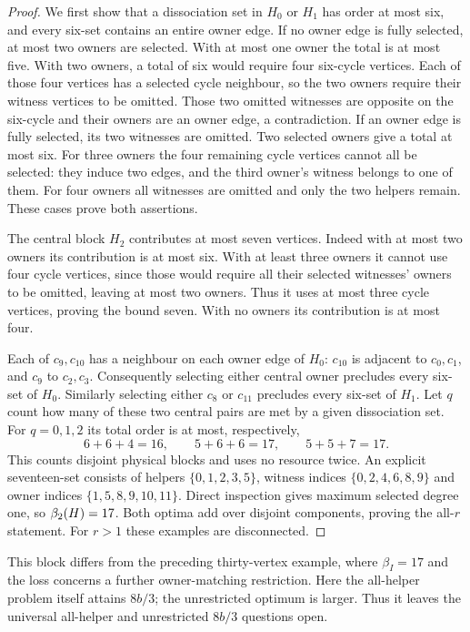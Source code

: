 \begin{proof}
We first show that a dissociation set in $H_0$ or $H_1$ has order at most
six, and every six-set contains an entire owner edge. If no owner edge is
fully selected, at most two owners are selected. With at most one owner
the total is at most five. With two owners, a total of six would require
four six-cycle vertices. Each of those four vertices has a selected cycle
neighbour, so the two owners require their witness vertices to be omitted.
Those two omitted witnesses are opposite on the six-cycle and their owners
are an owner edge, a contradiction. If an owner edge is fully selected,
its two witnesses are omitted. Two selected owners give a total at most six.
For three owners the four remaining cycle vertices cannot all be selected:
they induce two edges, and the third owner's witness belongs to one of them.
For four owners all witnesses are omitted and only the two helpers remain.
These cases prove both assertions.

The central block $H_2$ contributes at most seven vertices. Indeed with at
most two owners its contribution is at most six. With at least three owners
it cannot use four cycle vertices, since those would require all their
selected witnesses' owners to be omitted, leaving at most two owners.
Thus it uses at most three cycle vertices, proving the bound seven.
With no owners its contribution is at most four.

Each of $c_9,c_{10}$ has a neighbour on each owner edge of $H_0$:
$c_{10}$ is adjacent to $c_0,c_1$, and $c_9$ to $c_2,c_3$.
Consequently selecting either central owner precludes every six-set of
$H_0$. Similarly selecting either $c_8$ or $c_{11}$ precludes every six-set
of $H_1$. Let $q$ count how many of these two central pairs are met by a
given dissociation set. For $q=0,1,2$ its total order is at most, respectively,
\[
 6+6+4=16,\qquad 5+6+6=17,\qquad 5+5+7=17.
\]
This counts disjoint physical blocks and uses no resource twice.
An explicit seventeen-set consists of helpers $\{0,1,2,3,5\}$,
witness indices $\{0,2,4,6,8,9\}$ and owner indices
$\{1,5,8,9,10,11\}$. Direct inspection gives maximum selected degree one,
so $\beta_2(H)=17$. Both optima add over disjoint components, proving the
all-$r$ statement. For $r>1$ these examples are disconnected.
\end{proof}

This block differs from the preceding thirty-vertex example, where
$\beta_I=17$ and the loss concerns a further owner-matching restriction.
Here the all-helper problem itself attains $8b/3$; the unrestricted optimum
is larger. Thus it leaves the universal all-helper and unrestricted $8b/3$
questions open.

